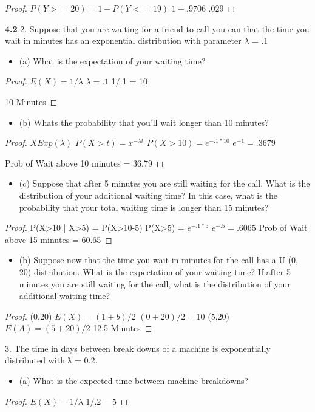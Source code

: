 \documentclass{article}
\begin{document}
\begin{enumerate}
\begin{proof}
$P(Y>=20) = 1-P(Y<=19)$
$1-.9706$
$.029$
\end{proof}
\textbf{4.2}
2. Suppose that you are waiting for a friend to call you can that the time you wait in minutes has an exponential distribution with parameter $\lambda$ = .1
        \begin{itemize}
            \item (a) What is the expectation of your waiting time?
        \end{itemize}
    \begin{proof}
$E(X) = 1/\lambda$
$\lambda = .1$
1/.1 = 10

10 Minutes
    \end{proof}
    \begin{itemize}
        \item (b) Whats the probability that you'll wait longer than 10 minutes?
    \end{itemize}
\begin{proof}
$X Exp(\lambda)$
$P(X>t) = x^{-\lambda t}$
$P(X>10) = e^{-.1*10}$
$e^{-1} = .3679$

Prob of Wait above 10 minutes = 36.79%
    \end{proof}
        \begin{itemize}
            \item (c)  Suppose that after 5 minutes you are still waiting for the call. What is the distribution of your additional waiting time? In this case, what is the probability that your total waiting time is longer than 15 minutes?
        \end{itemize}
    \begin{proof}
P(X>10 | X>5) = P(X>10-5)
P(X>5) = $e^{-.1*5}$
$e^{-.5} = .6065$
Prob of Wait above 15 minutes = 60.65%
    \end{proof}
        \begin{itemize}
            \item (b)  Suppose now that the time you wait in minutes for the call has a U (0, 20) distribution. What is the expectation of your waiting time? If after 5 minutes you are still waiting for the call, what is the distribution of your additional waiting time?
        \end{itemize}
\begin{proof}
(0,20)
$E(X) = (1+b)/2$
$(0+20)/2 = 10$
(5,20)
$E(A) = (5+20)/2$
12.5 Minutes
    \end{proof}
3. The time in days between break downs of a machine is exponentially distributed with λ = 0.2.
        \begin{itemize}
            \item (a) What is the expected time between machine breakdowns?
        \end{itemize}
    \begin{proof}
$E(X)=1/\lambda$
$1/.2 = 5$


\end{proof}
\end{enumerate}
\end{document}
